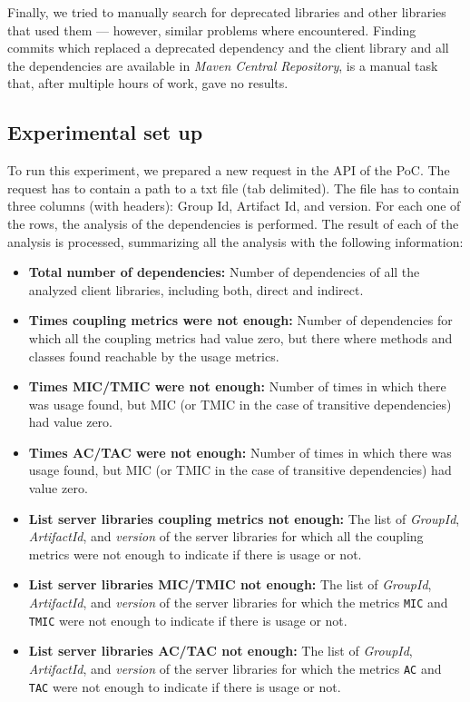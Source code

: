 Finally, we tried to manually search for deprecated libraries and other libraries that used them — however, similar problems where encountered. Finding commits which replaced a deprecated dependency and the client library and all the dependencies are available in \textit{Maven Central Repository}, is a manual task that, after multiple hours of work, gave no results.


\subsection{Experimental set up}
To run this experiment, we prepared a new request in the API of the PoC. The request has to contain a path to a txt file (tab delimited). The file has to contain three columns (with headers): Group Id, Artifact Id, and version. For each one of the rows, the analysis of the dependencies is performed. The result of each of the analysis is processed, summarizing all the analysis with the following information:

\begin{itemize}
  \item \textbf{Total number of dependencies:} Number of dependencies of all the analyzed client libraries, including both, direct and indirect.
  \item \textbf{Times coupling metrics were not enough:} Number of dependencies for which all the coupling metrics had value zero, but there where methods and classes found reachable by the usage metrics.
  \item \textbf{Times MIC/TMIC were not enough:} Number of times in which there was usage found, but MIC (or TMIC in the case of transitive dependencies) had value zero.
  \item \textbf{Times AC/TAC were not enough:} Number of times in which there was usage found, but MIC (or TMIC in the case of transitive dependencies) had value zero.
  \item \textbf{List server libraries coupling metrics not enough:} The list of \textit{GroupId}, \textit{ArtifactId}, and \textit{version} of the server libraries for which all the coupling metrics were not enough to indicate if there is usage or not.
  \item \textbf{List server libraries MIC/TMIC not enough:} The list of \textit{GroupId}, \textit{ArtifactId}, and \textit{version} of the server libraries for which the metrics \texttt{MIC} and \texttt{TMIC} were not enough to indicate if there is usage or not.
  \item \textbf{List server libraries AC/TAC not enough:} The list of \textit{GroupId}, \textit{ArtifactId}, and \textit{version} of the server libraries for which the metrics \texttt{AC} and \texttt{TAC} were not enough to indicate if there is usage or not.
\end{itemize}

